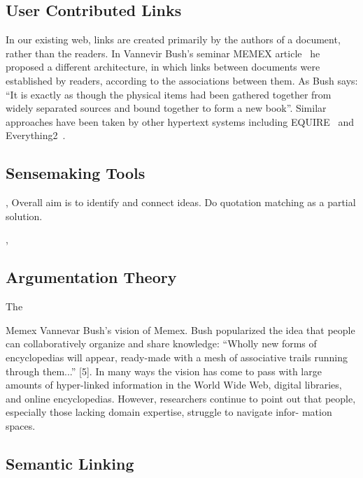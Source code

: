 \documentclass{chi2009}
\begin{document}
\subsection{User Contributed Links}

In our existing web, links are created primarily by the authors of a document, rather than the readers. In Vannevir Bush's seminar MEMEX article~\cite{memex} he proposed a different architecture, in which links between documents were established by readers, according to the associations between them. As Bush says: ``It is exactly as though the physical items had been gathered together from widely separated sources and bound together to form a new book''. Similar approaches have been taken by other hypertext systems including EQUIRE~\cite{enquire} and Everything2~\cite{everything2}.





\subsection{Sensemaking Tools}

\cite{scenthighlights}\cite{scenttrails}
\cite{quotations}, \cite{quotationdl} Overall aim is to identify and connect ideas. Do quotation matching as a partial solution.

\cite{scenthighlights}

\cite{ideanavigation}, \cite{citesense}


\subsection{Argumentation Theory}

The 
\cite{Korb97acognitive}
\cite{toulmin}
\cite{carneades}
\cite{conceptmap}
\cite{argmas}

Memex
Vannevar 
Bush's vision of Memex. Bush popularized the idea that 
people can collaboratively organize and share knowledge: 
``Wholly new forms of encyclopedias will appear, ready-made 
with a mesh of associative trails running through them...'' 
[5]. In many ways the vision has come to pass with large 
amounts of hyper-linked information in the World Wide 
Web, digital libraries, and online encyclopedias. However, 
researchers continue to point out that people, especially 
those lacking domain expertise, struggle to navigate infor- 
mation spaces. 


\subsection{Semantic Linking}
\end{document}
